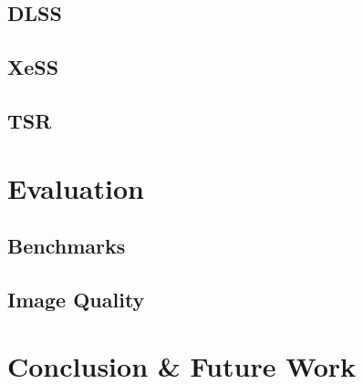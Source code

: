 \documentclass[letterpaper, 10 pt, conference]{ieeeconf}  %
\begin{document}
\subsection{DLSS}
\subsection{XeSS}
\subsection{TSR}

\section{Evaluation}
\label{Sec:Evaluation}
\subsection{Benchmarks}
\subsection{Image Quality}

\section{Conclusion \& Future Work}
\label{Sec:ConcFuture}











\printbibliography[
title={Papers},
notkeyword=game, notkeyword=online
]

\printbibliography[
title={Online},
keyword=online
]
\end{document}
